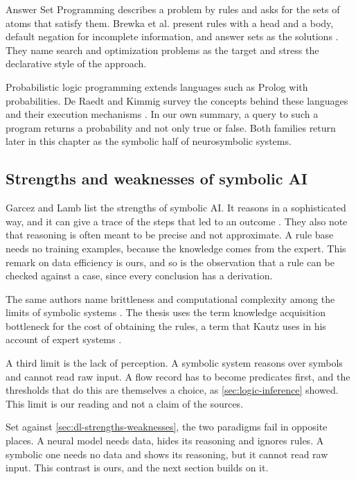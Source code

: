 Answer Set Programming describes a problem by rules and asks for the sets of
atoms that satisfy them. Brewka et al. present rules with a head and a body,
default negation for incomplete information, and answer sets as the
solutions \citep{brewka2011answer}. They name search and optimization
problems as the target and stress the declarative style of the approach.

Probabilistic logic programming extends languages such as Prolog with
probabilities. De Raedt and Kimmig survey the concepts behind these languages
and their execution mechanisms \citep{deraedt2015probabilistic}. In our own
summary, a query to such a program returns a probability and not only true
or false. Both families return later in this chapter as the symbolic half of
neurosymbolic systems.

\subsection{Strengths and weaknesses of symbolic AI}
\label{sec:symbolic-strengths-weaknesses}

Garcez and Lamb list the strengths of symbolic AI. It reasons in a
sophisticated way, and it can give a trace of the steps that led to an
outcome \citep{garcez2020thirdwave}. They also note that reasoning is often
meant to be precise and not approximate. A rule base needs no training
examples, because the knowledge comes from the expert. This remark on data
efficiency is ours, and so is the observation that a rule can be checked
against a case, since every conclusion has a derivation.

The same authors name brittleness and computational complexity among the
limits of symbolic systems \citep{garcez2020thirdwave}. The thesis uses the
term knowledge acquisition bottleneck for the cost of obtaining the rules, a
term that Kautz uses in his account of expert systems \citep{kautz2022third}.

A third limit is the lack of perception. A symbolic system reasons over
symbols and cannot read raw input. A flow record has to become predicates
first, and the thresholds that do this are themselves a choice, as
\cref{sec:logic-inference} showed. This limit is our reading and not a claim
of the sources.

Set against \cref{sec:dl-strengths-weaknesses}, the two paradigms fail in
opposite places. A neural model needs data, hides its reasoning and ignores
rules. A symbolic one needs no data and shows its reasoning, but it cannot
read raw input. This contrast is ours, and the next section builds on it.

